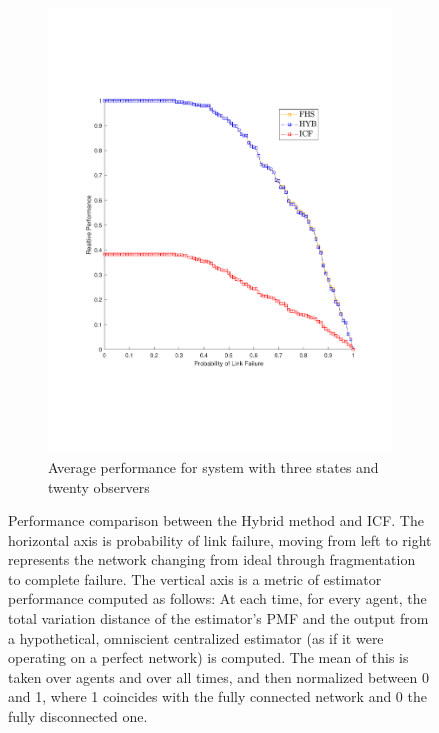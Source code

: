 \documentclass[journal]{IEEEtran}
\theoremstyle{remark}
\theoremstyle{definition}
\begin{document}
\begin{figure}
\begin{subfigure}{0.50\textwidth}
		\includegraphics[width=\linewidth]{./CaseC_FigPerf_20N_3S_RndNet.pdf}
		\caption{Average performance for system with three states and twenty observers} \label{fig:1b}
	\end{subfigure}
	\caption{Performance comparison between the Hybrid method and ICF. The horizontal axis   is probability of link failure, moving from left to right represents the network changing 
		from ideal through fragmentation to complete failure. The vertical axis is a metric of estimator performance
		computed as follows: At each time, for every agent, the total variation distance of the estimator's PMF and the output from a hypothetical, omniscient centralized estimator (as if it were operating on a perfect network) is computed. The mean of this is taken over agents and over all times, and then normalized between 0 and 1, where 1 coincides with the fully connected network and 0 the fully disconnected one.
		\label{fig:gcf2}}
\end{figure}
\balance
\end{document}
